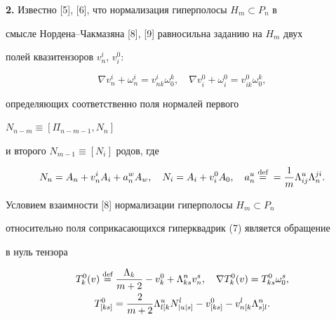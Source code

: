\medskip 


 


{\bf 2.} Известно [5], [6], что нормализация гиперполосы $H_m\subset 


P_n$ в 


смысле Нордена--Чакмазяна [8], [9] равносильна заданию на $H_m$ двух 


полей квазитензоров $v^i_n$, $v^0_i$: 


\begin{equation} 


\nabla v^i_n+\omega^i_n=v^i_{n k}\omega^k_0,\quad 


\nabla v^0_i+\omega^0_i=v^0_{i k}\omega^k_0, 


\end{equation} 


определяющих соответственно поля нормалей первого 


$N_{n-m}\equiv[\Pi_{n-m-1},N_n]$ 


и второго $N_{m-1}\equiv[N_i]$ родов, где 


\begin{equation} 


N_n=A_n+v^i_n A_i+a^w_n A_w,\quad 


N_i=A_i+v^0_i A_0,\quad a^u_n\up{\text{def}}{=}=\frac{1}{m} 


\Lambda^u_{ij}\Lambda^{j i}_n. 


\end{equation} 


 


Условием взаимности [8] нормализации гиперполосы $H_m\subset P_n$ 


относительно поля соприкасающихся гиперквадрик (7) является обращение 


в нуль тензора 


\begin{gather} 


T^0_k(v)\up{\text{def}}{=}\frac{\Lambda_k}{m+2}-v^0_k+ 


\Lambda^n_{k s}v^s_n,\quad \nabla T^0_k(v)=T^0_{k s}\omega^s_0,\\ 


%


T^0_{[k s]}=\frac{2}{m+2}\Lambda^u_{l[k}N^l_{|u|s]}- 


v^0_{[k s]}-v^l_{n[k}\Lambda^n_{s]l}.\notag 


\end{gather} 


